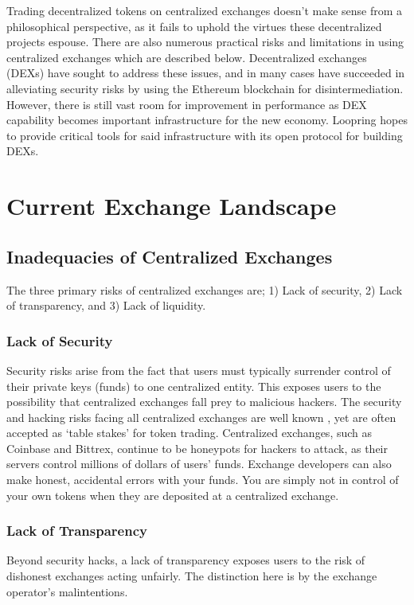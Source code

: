 \documentclass[UTF8,nofonts]{article}
\begin{document}
Trading decentralized tokens on centralized exchanges doesn't make sense from a philosophical perspective, as it fails to uphold the virtues these decentralized projects espouse. There are also numerous practical risks and limitations in using centralized exchanges which are described below. Decentralized exchanges (DEXs) \cite{schuh2015bitshares} \cite{bancor} \cite{kyber} \cite{warren20170x} have sought to address these issues, and in many cases have succeeded in alleviating security risks by using the Ethereum blockchain for disintermediation. However, there is still vast room for improvement in performance as DEX capability becomes important infrastructure for the new economy. Loopring hopes to provide critical tools for said infrastructure with its open protocol for building DEXs. 

\section{Current Exchange Landscape\label{sec:current_exchange_landscape}}

\subsection{Inadequacies of Centralized Exchanges}
The three primary risks of centralized exchanges are; 1) Lack of security, 2) Lack of transparency, and 3) Lack of liquidity.

\subsubsection{Lack of Security}
Security risks arise from the fact that users must typically surrender control of their private keys (funds) to one centralized entity. This exposes users to the possibility that centralized exchanges fall prey to malicious hackers. The security and hacking risks facing all centralized exchanges are well known \cite{coincheckhack} \cite{mtgox} \cite{mcmillan2014inside}, yet are often accepted as ‘table stakes' for token trading. Centralized exchanges, such as Coinbase and Bittrex, continue to be honeypots for hackers to attack, as their servers control millions of dollars of users' funds. Exchange developers can also make honest, accidental errors with your funds. You are simply not in control of your own tokens when they are deposited at a centralized exchange.

\subsubsection{Lack of Transparency}
Beyond security hacks, a lack of transparency exposes users to the risk of dishonest exchanges acting unfairly. The distinction here is by the exchange operator's malintentions. 
\end{document}
